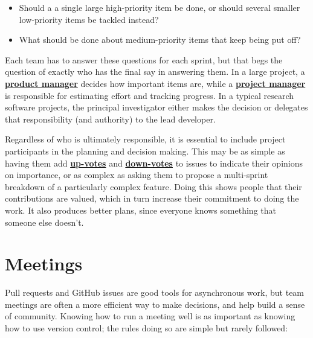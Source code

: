 \documentclass[
]{krantz}
\providecommand{\tightlist}{%
  \setlength{\itemsep}{0pt}\setlength{\parskip}{0pt}}
\newcommand{\gref}[2]{\hyperlink{#2}{\textbf{#1}}}
\begin{document}
\begin{itemize}
\tightlist
\item
  Should a a single large high-priority item be done,
  or should several smaller low-priority items be tackled instead?
\item
  What should be done about medium-priority items that keep being put off?
\end{itemize}

Each team has to answer these questions for each sprint,
but that begs the question of exactly who has the final say in answering them.
In a large project,
a \gref{product manager}{product\_manager} decides how important items are,
while a \gref{project manager}{project\_manager} is responsible for estimating effort
and tracking progress.
In a typical research software projects,
the principal investigator either makes the decision
or delegates that responsibility (and authority) to the lead developer.

Regardless of who is ultimately responsible,
it is essential to include project participants in the planning and decision making.
This may be as simple as having them add \gref{up-votes}{up\_vote}
and \gref{down-votes}{down\_vote} to issues
to indicate their opinions on importance,
or as complex as asking them to propose
a multi-sprint breakdown of a particularly complex feature.
Doing this shows people that their contributions are valued,
which in turn increase their commitment to doing the work.
It also produces better plans,
since everyone knows something that someone else doesn't.

\hypertarget{teams-meetings}{%
\section{Meetings}\label{teams-meetings}}

Pull requests and GitHub issues are good tools for asynchronous work,
but team meetings are often a more efficient way to make decisions,
and help build a sense of community.
Knowing how to run a meeting well
is as important as knowing how to use version control;
the rules doing so are simple but rarely followed:
\end{document}
